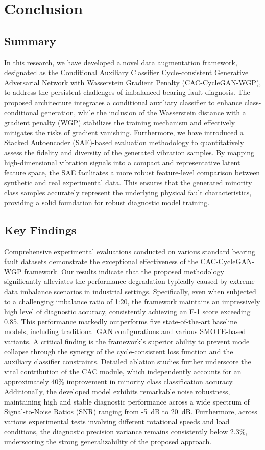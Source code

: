 \section{Conclusion}
\label{sec:conclusion}

\subsection{Summary}
In this research, we have developed a novel data augmentation framework, designated as the Conditional Auxiliary Classifier Cycle-consistent Generative Adversarial Network with Wasserstein Gradient Penalty (CAC-CycleGAN-WGP), to address the persistent challenges of imbalanced bearing fault diagnosis. The proposed architecture integrates a conditional auxiliary classifier to enhance class-conditional generation, while the inclusion of the Wasserstein distance with a gradient penalty (WGP) stabilizes the training mechanism and effectively mitigates the risks of gradient vanishing. Furthermore, we have introduced a Stacked Autoencoder (SAE)-based evaluation methodology to quantitatively assess the fidelity and diversity of the generated vibration samples. By mapping high-dimensional vibration signals into a compact and representative latent feature space, the SAE facilitates a more robust feature-level comparison between synthetic and real experimental data. This ensures that the generated minority class samples accurately represent the underlying physical fault characteristics, providing a solid foundation for robust diagnostic model training.

\subsection{Key Findings}
Comprehensive experimental evaluations conducted on various standard bearing fault datasets demonstrate the exceptional effectiveness of the CAC-CycleGAN-WGP framework. Our results indicate that the proposed methodology significantly alleviates the performance degradation typically caused by extreme data imbalance scenarios in industrial settings. Specifically, even when subjected to a challenging imbalance ratio of 1:20, the framework maintains an impressively high level of diagnostic accuracy, consistently achieving an F-1 score exceeding 0.85. This performance markedly outperforms five state-of-the-art baseline models, including traditional GAN configurations and various SMOTE-based variants. A critical finding is the framework's superior ability to prevent mode collapse through the synergy of the cycle-consistent loss function and the auxiliary classifier constraints. Detailed ablation studies further underscore the vital contribution of the CAC module, which independently accounts for an approximately 40\% improvement in minority class classification accuracy. Additionally, the developed model exhibits remarkable noise robustness, maintaining high and stable diagnostic performance across a wide spectrum of Signal-to-Noise Ratios (SNR) ranging from -5~dB to 20~dB. Furthermore, across various experimental tests involving different rotational speeds and load conditions, the diagnostic precision variance remains consistently below 2.3\%, underscoring the strong generalizability of the proposed approach.

